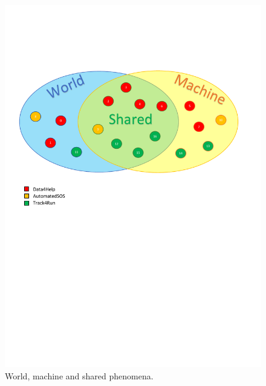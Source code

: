 \documentclass[a4paper]{article}
\begin{document}
    \begin{figure}[h!]
        \centering
        \includegraphics[width=\linewidth]{worldMachineShared-small}
        \caption{World, machine and shared phenomena.}
        \label{fig:my_label}
    \end{figure}
    
    
\end{document}
